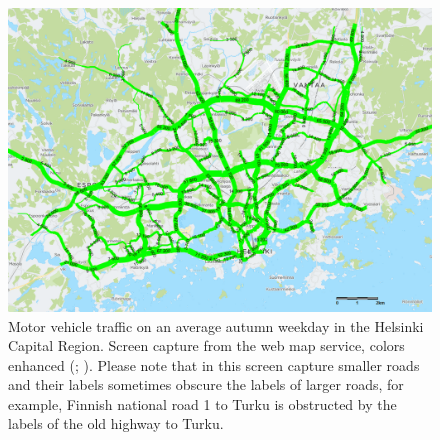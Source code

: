 \begin{figure}[H]%
    \includegraphics[width=\textwidth]{images/traffic_amount_autumn2018.png}
    \caption[Motor vehicle traffic on main roads in Helsinki Capital Region]{Motor vehicle traffic on an average autumn weekday in the Helsinki Capital Region. Screen capture from the web map service, colors enhanced (\cite{Helsinginseudunliikenne2019}; \cite{OpenStreetMap}). Please note that in this screen capture smaller roads and their labels sometimes obscure the labels of larger roads, for example, Finnish national road 1 to Turku is obstructed by the labels of the old highway to Turku.}%
    \label{fig:traffic_amount_autumn2018}%
\end{figure}

